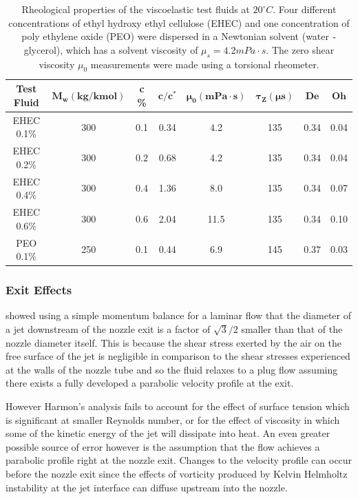 \documentclass[11pt]{article}
\begin{document}
\begin{table}[t]
\begin{center}
	\begin{tabular}{c|c|c|c|c|c|c|c} \hline
		\textbf{Test Fluid} & $\mathbf{M_w (kg/kmol)}$ & \textbf{c \%} & $\mathbf{c/c^*}$ & $\mathbf{\mu_0 (mPa \cdot s)}$ & $\mathbf{\tau_Z (\mu s)}$ & $\mathbf{De}$ & $\mathbf{Oh}$  \\ \hline 
		EHEC 0.1\% & 300 & 0.1 & 0.34 & 4.2 & 135 & 0.34 &0.04 \\
		EHEC 0.2\% & 300 & 0.2 & 0.68 & 4.2 & 135 & 0.34 &0.04 \\
		EHEC 0.4\% & 300 & 0.4 & 1.36 & 8.0 & 135 & 0.34 &0.07 \\
		EHEC 0.6\% & 300 & 0.6 & 2.04 & 11.5 & 135 & 0.34 &0.10 \\
		PEO 0.1\% & 250 & 0.1 & 0.44 & 6.9 & 145 & 0.37 & 0.03\\ \hline
	\end{tabular}
	\caption{Rheological properties of the viscoelastic test fluids at $20^\circ C$. Four different concentrations of ethyl hydroxy ethyl cellulose (EHEC) and one concentration of poly ethylene oxide (PEO) were dispersed in a Newtonian solvent (water ${\text -}$ glycerol), which has a solvent viscosity of $\mu_s = 4.2 mPa \cdot s$. The zero shear viscosity $\mu_0$ measurements were made using a torsional rheometer.}
	\label{tbl:rheo_prop}
\end{center}	
\end{table}

\subsubsection{Exit Effects}
\label{sec:exit}
\cite{harmon1955drop} showed using a simple momentum balance for a laminar flow that the diameter of a jet downstream of the nozzle exit is a factor of $\sqrt{3}/2$ smaller than that of the nozzle diameter itself. This is because the shear stress exerted by the air on the free surface of the jet is negligible in comparison to the shear stresses experienced at the walls of the nozzle tube and so the fluid relaxes to a plug flow assuming there exists a fully developed a parabolic velocity profile at the exit.

However Harmon's analysis fails to account for the effect of surface tension which is significant at smaller Reynolds number, or for the effect of viscosity in which some of the kinetic energy of the jet will dissipate into heat. An even greater possible source of error however is the assumption that the flow achieves a parabolic profile right at the nozzle exit. Changes to the velocity profile can occur before the nozzle exit since the effects of vorticity produced by Kelvin Helmholtz instability at the jet interface can diffuse upstream into the nozzle.
\end{document}
